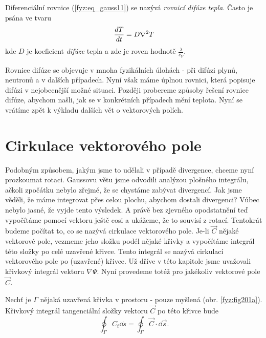 {      Diferenciální rovnice (\ref{fyz:eq_gauss11}) se nazývá \emph{rovnicí difúze tepla}. Často je 
      psána ve tvaru
      \begin{equation}\label{fyz:eq_gauss12}
       \frac{d T}{d t} = D\nabla^2T
      \end{equation}
      kde \(D\) je koeficient \emph{difúze} tepla a zde je roven hodnotě
      \(\displaystyle\frac{\lambda}{c_V}\).
      
      Rovnice difúze se objevuje v mnoha fyzikálních úlohách - při difúzi plynů, neutronů a v 
      dalších případech. Nyní však máme úplnou rovnici, která popisuje difúzi v nejobecnější možné 
      situaci. Později probereme způsoby řešení rovnice difúze, abychom našli, jak se v konkrétních 
      případech mění teplota. Nyní se vrátíme zpět k výkladu dalších vět o vektorových polích.

  \section{Cirkulace vektorového pole}
    Podobným způsobem, jakým jsme to udělali v případě divergence, chceme nyní prozkoumat rotaci. 
    Gaussovu větu jsme odvodili analýzou plošného integrálu, ačkoli zpočátku nebylo zřejmé, že se 
    chystáme zabývat divergencí. Jak jsme věděli, že máme integrovat přes celou plochu, abychom 
    dostali divergenci? Vůbec nebylo jasné, že vyjde tento výsledek. A právě bez zjevného  
    opodstatnění teď vypočítáme pomocí vektoru ještě cosi a ukážeme, že to souvisí z rotací. 
    Tentokrát budeme počítat to, co se nazývá cirkulace vektorového pole. Je-li \(\vec{C}\) nějaké 
    vektorové pole, vezmeme jeho složku podél nějaké křivky a vypočítáme integrál této složky po 
    celé uzavřené křivce. Tento integrál se nazývá cirkulací vektorového pole po (uzavřené) křivce. 
    Už dříve v této kapitole jsme uvažovali křivkový integrál vektoru \(\nabla\Psi\). Nyní 
    provedeme totéž pro jakékoliv vektorové pole \(\vec{C}\).
    
    Nechť je \(\Gamma\) nějaká uzavřená křivka v prostoru - pouze myšlená (obr. \ref{fyz:fig201a}). 
    Křivkový integrál tangenciální složky vektoru \(\vec{C}\) po této křivce bude
    \begin{equation}\label{fyz:eq_fey_circ1}
     \oint_\Gamma C_t\dd{s} = \oint_\Gamma\vec{C}\cdot\dd{\vec{s}}.
    \end{equation}    
    
}
